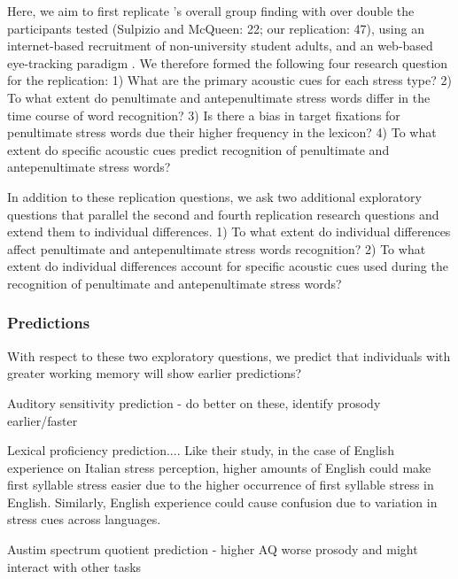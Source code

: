 Here, we aim to first replicate \cite{Sulpizio_McQueen_2012}'s overall group finding with over double the participants tested (Sulpizio and McQueen: 22; our replication: 47), using an internet-based recruitment of non-university student adults, and an web-based eye-tracking paradigm \citep{Vos_2017}. We therefore formed the following four research question for the replication: 1) What are the primary acoustic cues for each stress type? 2) To what extent do penultimate and antepenultimate stress words differ in the time course of word recognition? 3) Is there a bias in target fixations for penultimate stress words due their higher frequency in the lexicon? 4) To what extent do specific acoustic cues predict recognition of penultimate and antepenultimate stress words? 

In addition to these replication questions, we ask two additional exploratory questions that parallel the second and fourth replication research questions and extend them to individual differences. 1) To what extent do individual differences affect penultimate and antepenultimate stress words recognition? 2) To what extent do individual differences account for specific acoustic cues used during the recognition of penultimate and antepenultimate stress words?

\subsubsection{Predictions}

With respect to these two exploratory questions, we predict that individuals with greater working memory will show earlier predictions? \citep[e.g.,][]{Traxler2009}

Auditory sensitivity prediction - do better on these, identify prosody earlier/faster

Lexical proficiency prediction....  Like their study, in the case of English experience on Italian stress perception, higher amounts of English could make first syllable stress easier due to the higher occurrence of first syllable stress in English. Similarly, English experience could cause confusion due to variation in stress cues across languages.

Austim spectrum quotient prediction - higher AQ worse prosody and might interact with other tasks 
